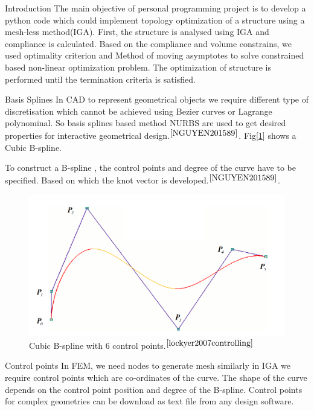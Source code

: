 \documentclass[a4paper,12pt,times]{article}
\begin{document}
\begin{section}{Introduction}
The main objective of personal programming project is to develop a python code which could implement topology optimization of a structure using a mesh-less method(IGA). First, the structure is analysed using IGA and compliance is calculated. Based on the compliance and volume constrains, we used optimality criterion and Method of moving asymptotes to solve constrained based non-linear optimization problem. The optimization of structure is performed until the termination criteria is satisfied.

\end{section}

\begin{section}{Basis Splines}
In CAD to represent geometrical objects we require different type of discretisation which cannot be achieved using Bezier curves or Lagrange polynominal. So basis splines based method NURBS are used to get desired properties for interactive geometrical design.$^{\cite{NGUYEN201589}}$. Fig[\ref{fig:Cubic B-Spline}] shows a Cubic B-spline.

To construct a B-spline , the control points and degree of the curve have to be specified. Based on which the knot vector is developed.$^{\cite{NGUYEN201589}}$. 


\begin{figure}[h!]
\centering
\includegraphics[width=0.75\linewidth]{Bsplines_figure1.png}
\caption{Cubic B-spline with 6 control points.$^{\cite{lockyer2007controlling}}$}
\label{fig:Cubic B-Spline}
\end{figure}

\begin{subsection}{Control points}
In FEM, we need nodes to generate mesh similarly in IGA we require control points which are co-ordinates of the curve. The shape of the curve depends on the control point position and degree of the B-spline. Control points for complex geometries can be download as text file from any design software. 
\end{subsection}


\end{section}
\end{document}
